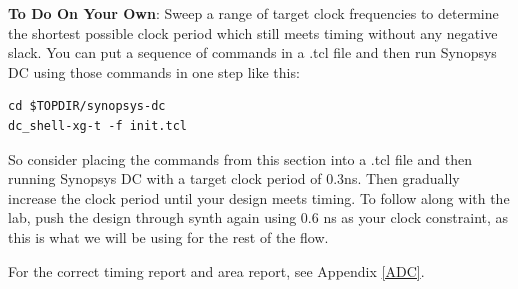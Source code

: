 \documentclass[a4paper,12pt,twoside]{article}
\begin{document}
\textbf{To Do On Your Own}: Sweep a range of target clock frequencies to determine the shortest possible clock period which still meets timing without any negative slack. You can put a sequence of commands in a .tcl file and then run Synopsys DC using those commands in one step like this:
\begin{verbatim}
cd $TOPDIR/synopsys-dc
dc_shell-xg-t -f init.tcl
\end{verbatim}
So consider placing the commands from this section into a .tcl file and then running Synopsys DC with a target clock period of 0.3ns. Then gradually increase the clock period until your design meets timing. To follow along with the lab, push the design through synth again using 0.6 ns as your clock constraint, as this is what we will be using for the rest of the flow.

For the correct timing report and area report, see Appendix \ref{ADC}.
\end{document}
